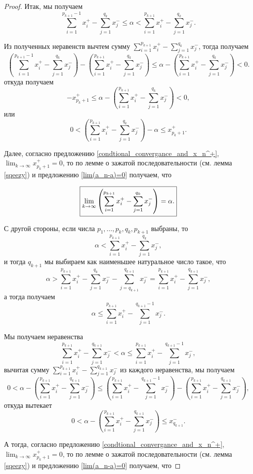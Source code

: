 \begin{proof}
Итак, мы получаем
\[
 \sum_{i=1}^{p_{k+1}-1}x_i^+ - \sum_{j=1}^{q_k}x_j^- \le \alpha < \sum_{i=1}^{p_{k+1}}x_i^+ - \sum_{j=1}^{q_k}x_j^-.
\]

Из полученных неравенств вычтем сумму $\sum_{i=1}^{p_{k+1}}x_i^+ - \sum_{j=1}^{q_k}x_j^-$, тогда получаем
\[
 \left(\sum_{i=1}^{p_{k+1}-1}x_i^+ - \sum_{j=1}^{q_k}x_j^-\right) - \left( \sum_{i=1}^{p_{k+1}}x_i^+ - \sum_{j=1}^{q_k}x_j^- \right) \le \alpha - \left( \sum_{i=1}^{p_{k+1}}x_i^+ - \sum_{j=1}^{q_k}x_j^- \right) < 0.
\]
откуда получаем
\[
 - x_{p_k+1}^+ \le \alpha - \left( \sum_{i=1}^{p_{k+1}}x_i^+ - \sum_{j=1}^{q_k}x_j^- \right) < 0,
\]
или
\[
 0 < \left( \sum_{i=1}^{p_{k+1}}x_i^+ - \sum_{j=1}^{q_k}x_j^- \right) - \alpha \le x_{p_k+1}^+.
\]

Далее, согласно предложению \ref{condtional_convergance_and_x_n^+}, $\lim_{k \to \infty}x_{p_k+1}^+ = 0$, то по лемме о зажатой последовательности (см. лемма \ref{sqeezy}) и предложению \ref{lim(a_n-a)=0} получаем, что

\begin{equation}\label{S_{k+1,k}=a}
    \boxed{
    \lim_{k\to \infty} \left( \sum_{i=1}^{p_{k+1}}x_i^+ - \sum_{j=1}^{q_k}x_j^- \right) = \alpha.    
    }
\end{equation}

С другой стороны, если числа $p_1,\ldots, p_k,q_k,p_{k+1}$ выбраны, то
\[
 \alpha < \sum_{i=1}^{p_{k+1}} x_i^+-  \sum_{j=1}^{q_k}x_j^-,
\]
и тогда $q_{k+1}$ мы выбираем как наименьшее натуральное число такое, что
\[
 \alpha > \sum_{i=1}^{p_{k+1}} x_i^+-  \sum_{j=1}^{q_k}x_j^- - \sum_{j=q_{k+1}}^{q_{k+1}} x_j^- = \sum_{i=1}^{p_{k+1}} x_i^+-  \sum_{j=1}^{q_{k+1}}x_j^-,
\]
а тогда получаем
\[
 \alpha \le \sum_{i=1}^{p_{k+1}} x_i^+-  \sum_{j=1}^{q_{k+1}-1}x_j^-.
\]

Мы получаем неравенства
\[
 \sum_{i=1}^{p_{k+1}} x_i^+-  \sum_{j=1}^{q_{k+1}}x_j^- < \alpha \le \sum_{i=1}^{p_{k+1}} x_i^+-  \sum_{j=1}^{q_{k+1}-1}x_j^-, 
\]
вычитая сумму $\sum_{i=1}^{p_{k+1}} x_i^+-  \sum_{j=1}^{q_{k+1}}x_j^-$ из каждого неравенства, мы получаем
\[
 0 < \alpha - \left( \sum_{i=1}^{p_{k+1}} x_i^+-  \sum_{j=1}^{q_{k+1}}x_j^- \right) \le \left( \sum_{i=1}^{p_{k+1}} x_i^+-  \sum_{j=1}^{q_{k+1}-1}x_j^-\right) - \left( \sum_{i=1}^{p_{k+1}} x_i^+-  \sum_{j=1}^{q_{k+1}}x_j^-\right),
\]
откуда вытекает
\[
 0 < \alpha - \left( \sum_{i=1}^{p_{k+1}} x_i^+-  \sum_{j=1}^{q_{k+1}}x_j^- \right) \le x_{q_{k+1}}^-.
\]

А тогда, согласно предложению \ref{condtional_convergance_and_x_n^+}, $\lim_{k \to \infty}x_{p_k+1}^+ = 0$, то по лемме о зажатой последовательности (см. лемма \ref{sqeezy}) и предложению \ref{lim(a_n-a)=0} получаем, что


\end{proof}
